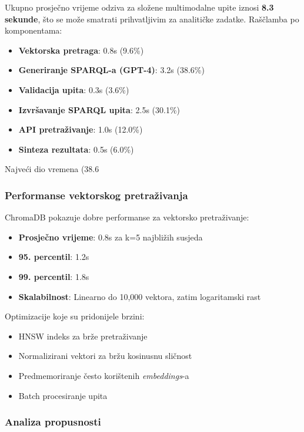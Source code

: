 Ukupno prosječno vrijeme odziva za složene multimodalne upite iznosi \textbf{8.3 sekunde}, što se može smatrati prihvatljivim za analitičke zadatke. Raščlamba po komponentama:

\begin{itemize}
    \item \textbf{Vektorska pretraga}: 0.8s (9.6\%)
    \item \textbf{Generiranje SPARQL-a (GPT-4)}: 3.2s (38.6\%)
    \item \textbf{Validacija upita}: 0.3s (3.6\%)
    \item \textbf{Izvršavanje SPARQL upita}: 2.5s (30.1\%)
    \item \textbf{API pretraživanje}: 1.0s (12.0\%)
    \item \textbf{Sinteza rezultata}: 0.5s (6.0\%)
\end{itemize}

Najveći dio vremena (38.6%

\subsubsection{Performanse vektorskog pretraživanja}

ChromaDB pokazuje dobre performanse za vektorsko pretraživanje:

\begin{itemize}
    \item \textbf{Prosječno vrijeme}: 0.8s za k=5 najbližih susjeda
    \item \textbf{95. percentil}: 1.2s
    \item \textbf{99. percentil}: 1.8s
    \item \textbf{Skalabilnost}: Linearno do 10,000 vektora, zatim logaritamski rast
\end{itemize}

Optimizacije koje su pridonijele brzini:
\begin{itemize}
    \item HNSW indeks za brže pretraživanje
    \item Normalizirani vektori za bržu kosinusnu sličnost
    \item Predmemoriranje često korištenih \textit{embeddings}-a
    \item Batch procesiranje upita
\end{itemize}

\subsubsection{Analiza propusnosti}

